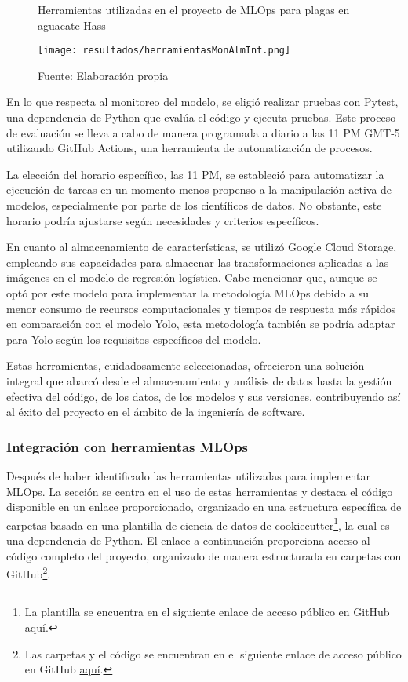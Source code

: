 \begin{figure}[h]
\centering
\caption{Herramientas utilizadas en el proyecto de MLOps para plagas en aguacate Hass}
\texttt{[image: resultados/herramientasMonAlmInt.png]}
\caption*{\footnotesize Fuente: Elaboración propia}
\label{fig:figuraHerramientasMonAlmInt}
\end{figure}

En lo que respecta al monitoreo del modelo, se eligió realizar pruebas con Pytest, una dependencia de Python que evalúa el código y ejecuta pruebas. Este proceso de evaluación se lleva a cabo de manera programada a diario a las 11 PM GMT-5 utilizando GitHub Actions, una herramienta de automatización de procesos. \newline

La elección del horario específico, las 11 PM, se estableció para automatizar la ejecución de tareas en un momento menos propenso a la manipulación activa de modelos, especialmente por parte de los científicos de datos. No obstante, este horario podría ajustarse según necesidades y criterios específicos. \newline

En cuanto al almacenamiento de características, se utilizó Google Cloud Storage, empleando sus capacidades para almacenar las transformaciones aplicadas a las imágenes en el modelo de regresión logística. Cabe mencionar que, aunque se optó por este modelo para implementar la metodología MLOps debido a su menor consumo de recursos computacionales y tiempos de respuesta más rápidos en comparación con el modelo Yolo, esta metodología también se podría adaptar para Yolo según los requisitos específicos del modelo. \newline

\newpage

Estas herramientas, cuidadosamente seleccionadas, ofrecieron una solución integral que abarcó desde el almacenamiento y análisis de datos hasta la gestión efectiva del código, de los datos, de los modelos y sus versiones, contribuyendo así al éxito del proyecto en el ámbito de la ingeniería de software.

\subsubsection{Integración con herramientas MLOps}

Después de haber identificado las herramientas utilizadas para implementar MLOps. La sección se centra en el uso de estas herramientas y destaca el código disponible en un enlace proporcionado, organizado en una estructura específica de carpetas basada en una plantilla de ciencia de datos de cookiecutter\footnote{La plantilla se encuentra en el siguiente enlace de acceso público en GitHub \href{https://github.com/khuyentran1401/data-science-template/tree/dvc-pip}{aquí}.}, la cual es una dependencia de Python. El enlace a continuación proporciona acceso al código completo del proyecto, organizado de manera estructurada en carpetas con GitHub\footnote{Las carpetas y el código se encuentran en el siguiente enlace de acceso público en GitHub \href{https://github.com/juferoto/mlops_project}{aquí}.}.

